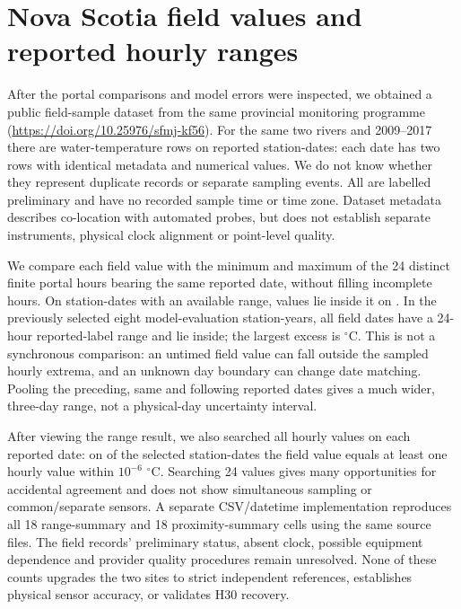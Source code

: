 \section{Nova Scotia field values and reported hourly ranges}
After the portal comparisons and model errors were inspected, we obtained a public field-sample dataset from the same provincial monitoring programme (\url{https://doi.org/10.25976/sfmj-kf56}). For the same two rivers and 2009--2017 there are \NSFieldRows{} water-temperature rows on \NSFieldDates{} reported station-dates: each date has two rows with identical metadata and numerical values. We do not know whether they represent duplicate records or separate sampling events. All are labelled preliminary and have no recorded sample time or time zone. Dataset metadata describes co-location with automated probes, but does not establish separate instruments, physical clock alignment or point-level quality.

We compare each field value with the minimum and maximum of the 24 distinct finite portal hours bearing the same reported date, without filling incomplete hours. On \NSFieldAllCompared{} station-dates with an available range, values lie inside it on \NSFieldAllWithin{}. In the previously selected eight model-evaluation station-years, all \NSFieldSelectedCompared{} field dates have a 24-hour reported-label range and \NSFieldSelectedWithin{} lie inside; the largest excess is \NSFieldMaxExcess{} $^{\circ}$C. This is not a synchronous comparison: an untimed field value can fall outside the sampled hourly extrema, and an unknown day boundary can change date matching. Pooling the preceding, same and following reported dates gives a much wider, three-day range, not a physical-day uncertainty interval.

After viewing the range result, we also searched all hourly values on each reported date: on \NSFieldSelectedExact{} of the \NSFieldSelectedCompared{} selected station-dates the field value equals at least one hourly value within $10^{-6}$ $^{\circ}$C. Searching 24 values gives many opportunities for accidental agreement and does not show simultaneous sampling or common/separate sensors. A separate CSV/datetime implementation reproduces all 18 range-summary and 18 proximity-summary cells using the same source files. The field records' preliminary status, absent clock, possible equipment dependence and provider quality procedures remain unresolved. None of these counts upgrades the two sites to strict independent references, establishes physical sensor accuracy, or validates H30 recovery.
